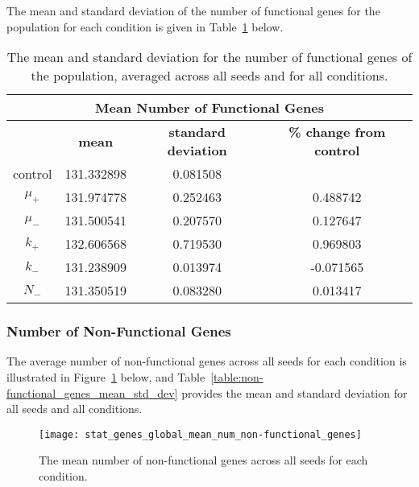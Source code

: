 The mean and standard deviation of the number of functional genes for the population for each condition is given in Table~\ref{table:number_of_genes_mean_std_dev} below.

\begin{table}[H]
	\centering
	\begin{tabular}{|c|c|c|c|}
		\hline
		\multicolumn{4}{c}{\Large \textbf{Mean Number of Functional Genes}} \\
		\hline
		& \textbf{mean} & \textbf{standard deviation} & \textbf{\% change from control} \\
		\hline
		control & 131.332898 & 0.081508 & \textemdash \\ 
		\hline
		$\mu_+$ & 131.974778 & 0.252463 & 0.488742 \\ 
		\hline
		$\mu_-$ & 131.500541 & 0.207570 & 0.127647 \\ 
		\hline
		$k_+$ & 132.606568 & 0.719530 & 0.969803 \\ 
		\hline
		$k_-$ & 131.238909 & 0.013974 & -0.071565 \\ 
		\hline
		$N_-$ & 131.350519 & 0.083280 & 0.013417 \\ 
		\hline
	\end{tabular}
	\caption[Number of functional genes - mean and standard deviation]{The mean and standard deviation for the number of functional genes of the population, averaged across all seeds and for all conditions.}
	\label{table:number_of_genes_mean_std_dev}
\end{table}
\subsubsection{Number of Non-Functional Genes}
The average number of non-functional genes across all seeds for each condition is illustrated in Figure~\ref{fig:mean_num_non-functional_genes} below, and Table~\ref{table:non-functional_genes_mean_std_dev} provides the mean and standard deviation for all seeds and all conditions.  

\begin{figure}[H]
	\centering
	\texttt{[image: stat\_genes\_global\_mean\_num\_non-functional\_genes]}
	\caption[Mean number of non-functional genes]{The mean number of non-functional genes across all seeds for each condition.}
	\label{fig:mean_num_non-functional_genes}
\end{figure}



